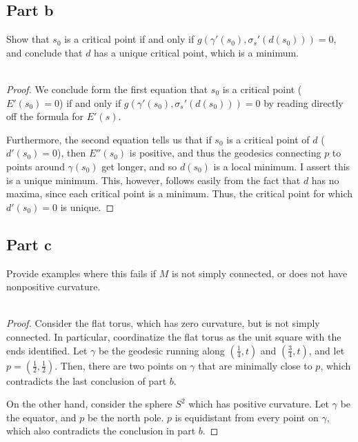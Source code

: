 \documentclass[fontsize=11pt]{scrartcl} %
\numberwithin{equation}{section} %
\numberwithin{figure}{section} %
\numberwithin{table}{section} %
\begin{document}
\subsection*{Part b}
Show that $s_0$ is a critical point if and only if
$g(\gamma'(s_0),\sigma_s'(d(s_0))) = 0$, and conclude that $d$ has a unique
critical point, which is a minimum.
\\
\\
\begin{proof}
We conclude form the first equation that $s_0$ is a critical point ($E'(s_0)=0$)
if and only if $g(\gamma'(s_0),\sigma_s'(d(s_0))) = 0$ by reading directly off
the formula for $E'(s)$.

Furthermore, the second equation tells us that if $s_0$ is a critical point of
$d$ ($d'(s_0)=0$), then $E''(s_0)$ is positive, and thus the geodesics
connecting $p$ to points around $\gamma(s_0)$ get longer, and so $d(s_0)$ is a
local minimum. I assert this is a unique minimum. This, however, follows easily
from the fact that $d$ has no maxima, since each critical point is a minimum.
Thus, the critical point for which $d'(s_0)=0$ is unique. 
\end{proof}

\subsection*{Part c}
Provide examples where this fails if $M$ is not simply connected, or does not
have nonpositive curvature.
\\
\\
\begin{proof}
    Consider the flat torus, which has zero curvature, but is not simply
    connected. In particular, coordinatize the flat torus as the unit square
    with the ends identified. Let $\gamma$ be the geodesic running along
    $(\frac{1}{4},t)$ and $(\frac{3}{4},t)$, and let
    $p=(\frac{1}{2},\frac{1}{2})$. Then, there are two points on $\gamma$ that
    are minimally close to $p$, which contradicts the last conclusion of part
    $b$.

    On the other hand, consider the sphere $S^2$ which has positive curvature.
    Let $\gamma$ be the equator, and $p$ be the north pole. $p$ is equidistant
    from every point on $\gamma$, which also contradicts the conclusion in part
    $b$.
\end{proof}
\end{document}
